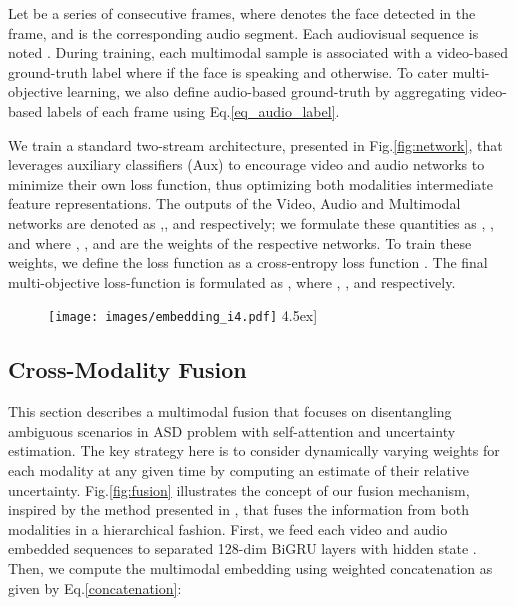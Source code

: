 \documentclass[a4paper]{article}
\begin{document}
Let  be a series of consecutive frames, where  denotes the  face detected in the  frame, and  is the corresponding audio segment.
Each audiovisual sequence is noted . During training, each multimodal sample  is associated with a video-based ground-truth label  where   if the face  is speaking and  otherwise. To cater multi-objective learning, we also define audio-based ground-truth by aggregating video-based labels of each frame using Eq.\ref{eq_audio_label}.

\indent We train a standard two-stream architecture, presented in Fig.\ref{fig:network}, that leverages auxiliary classifiers (Aux) to encourage video and audio networks to minimize their own loss function, thus optimizing both modalities intermediate feature representations. 
The outputs of the Video, Audio and Multimodal networks are denoted as ,, and  respectively; we formulate these quantities as , , and  where , , and  are the weights of the respective networks. To train these weights, we define the loss function  as a cross-entropy loss function . The final multi-objective loss-function  is formulated as , where , , and  respectively. 







\begin{figure}[t]
\centering
\texttt{[image: images/embedding\_i4.pdf]}
    \-4.5ex]
\label{fig:embeddings}
\end{figure}

\subsection{Cross-Modality Fusion}\label{fusion}

This section describes a multimodal fusion that focuses on disentangling ambiguous scenarios in ASD problem with self-attention and uncertainty estimation. The key strategy here is to consider dynamically varying weights for each modality at any given time by computing an estimate of their relative uncertainty. Fig.\ref{fig:fusion} illustrates the concept of our fusion mechanism, inspired by the method presented in \cite{melissa}, that 
fuses the information from both modalities in a hierarchical fashion. First, we feed each video  and audio  embedded sequences to separated 128-dim BiGRU layers with hidden state . 
Then, we compute the multimodal embedding  using weighted concatenation as given by Eq.\ref{concatenation}:
\end{document}

